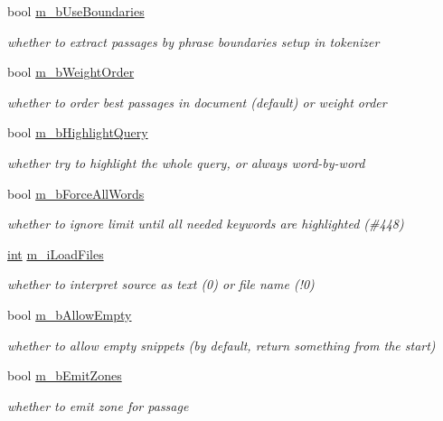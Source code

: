 \begin{DoxyCompactItemize}
bool \hyperlink{structExcerptQuery__t_a02cdd9a2a1cdc599d5404c7eb4285c8c}{m\-\_\-b\-Use\-Boundaries}
\begin{DoxyCompactList}\small\item\em whether to extract passages by phrase boundaries setup in tokenizer \end{DoxyCompactList}\item 
bool \hyperlink{structExcerptQuery__t_abdb6014f9dac0330d735aef9c6329002}{m\-\_\-b\-Weight\-Order}
\begin{DoxyCompactList}\small\item\em whether to order best passages in document (default) or weight order \end{DoxyCompactList}\item 
bool \hyperlink{structExcerptQuery__t_a91ac44e68478204ba4a532e5263f3084}{m\-\_\-b\-Highlight\-Query}
\begin{DoxyCompactList}\small\item\em whether try to highlight the whole query, or always word-\/by-\/word \end{DoxyCompactList}\item 
bool \hyperlink{structExcerptQuery__t_adb96d373f11459d1f49613dd7019f4ab}{m\-\_\-b\-Force\-All\-Words}
\begin{DoxyCompactList}\small\item\em whether to ignore limit until all needed keywords are highlighted (\#448) \end{DoxyCompactList}\item 
\hyperlink{sphinxexpr_8cpp_a4a26e8f9cb8b736e0c4cbf4d16de985e}{int} \hyperlink{structExcerptQuery__t_a4f777950b5faa471f8a6678e42349d8f}{m\-\_\-i\-Load\-Files}
\begin{DoxyCompactList}\small\item\em whether to interpret source as text (0) or file name (!0) \end{DoxyCompactList}\item 
bool \hyperlink{structExcerptQuery__t_aad27da5096c6450825a9f2bcc0926037}{m\-\_\-b\-Allow\-Empty}
\begin{DoxyCompactList}\small\item\em whether to allow empty snippets (by default, return something from the start) \end{DoxyCompactList}\item 
bool \hyperlink{structExcerptQuery__t_aedf08957851c70829e4df3c4090a4c3f}{m\-\_\-b\-Emit\-Zones}
\begin{DoxyCompactList}\small\item\em whether to emit zone for passage \end{DoxyCompactList}\item 

\end{DoxyCompactItemize}
